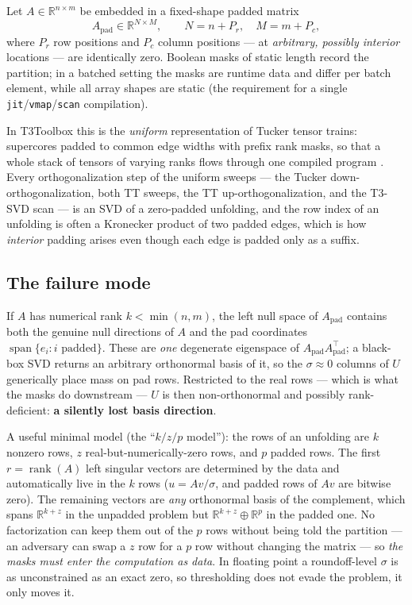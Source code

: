 \documentclass[11pt]{article}
\theoremstyle{definition}
\theoremstyle{remark}
\newcommand{\R}{\mathbb{R}}
\newcommand{\Apad}{A_{\mathrm{pad}}}
\newcommand{\rank}{\operatorname{rank}}
\newcommand{\code}[1]{\texttt{#1}}
\begin{document}
Let $A\in\R^{n\times m}$ be embedded in a fixed-shape padded matrix
\[
  \Apad\in\R^{N\times M},\qquad N = n + P_r,\quad M = m + P_c,
\]
where $P_r$ row positions and $P_c$ column positions --- at \emph{arbitrary, possibly interior}
locations --- are identically zero. Boolean masks of static length record the partition; in a
batched setting the masks are runtime data and differ per batch element, while all array shapes are
static (the requirement for a single \code{jit}/\code{vmap}/\code{scan} compilation).

In T3Toolbox this is the \emph{uniform} representation of Tucker tensor trains: supercores padded to
common edge widths with prefix rank masks, so that a whole stack of tensors of varying ranks flows
through one compiled program \cite{t3docs}. Every orthogonalization step of the uniform sweeps ---
the Tucker down-orthogonalization, both TT sweeps, the TT up-orthogonalization, and the T3-SVD scan --- is an SVD
of a zero-padded unfolding, and the row index of an unfolding is often a Kronecker product of two
padded edges, which is how \emph{interior} padding arises even though each edge is padded only as a
suffix.

\subsection{The failure mode}\label{sec:failure}

If $A$ has numerical rank $k<\min(n,m)$, the left null space of $\Apad$ contains both the genuine
null directions of $A$ and the pad coordinates $\operatorname{span}\{e_i : i \text{ padded}\}$.
These are \emph{one} degenerate eigenspace of $\Apad\Apad^{\top}$; a black-box SVD returns an
arbitrary orthonormal basis of it, so the $\sigma\approx 0$ columns of $U$ generically place mass on
pad rows. Restricted to the real rows --- which is what the masks do downstream --- $U$ is then
non-orthonormal and possibly rank-deficient: \textbf{a silently lost basis direction}.

A useful minimal model (the ``$k/z/p$ model''): the rows of an unfolding are $k$ nonzero rows, $z$
real-but-numerically-zero rows, and $p$ padded rows. The first $r=\rank(A)$ left singular vectors
are determined by the data and automatically live in the $k$ rows ($u = Av/\sigma$, and padded rows
of $Av$ are bitwise zero). The remaining vectors are \emph{any} orthonormal basis of the
complement, which spans $\R^{k+z}$ in the unpadded problem but $\R^{k+z}\oplus\R^{p}$ in the padded
one. No factorization can keep them out of the $p$ rows without being told the partition --- an
adversary can swap a $z$ row for a $p$ row without changing the matrix --- so \emph{the masks must
enter the computation as data}. In floating point a roundoff-level $\sigma$ is as unconstrained as
an exact zero, so thresholding does not evade the problem, it only moves it.
\end{document}
